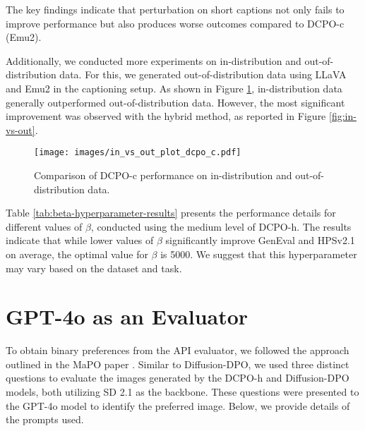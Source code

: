 


The key findings indicate that perturbation on short captions not only fails to improve performance but also produces worse outcomes compared to DCPO-c (Emu2).

Additionally, we conducted more experiments on in-distribution and out-of-distribution data. For this, we generated out-of-distribution data using LLaVA and Emu2 in the captioning setup. As shown in Figure \ref{fig:in-vs-out-dcpo-c}, in-distribution data generally outperformed out-of-distribution data. However, the most significant improvement was observed with the hybrid method, as reported in Figure \ref{fig:in-vs-out}.


\begin{figure}[h]
    \centering
    \texttt{[image: images/in\_vs\_out\_plot\_dcpo\_c.pdf]}
    \vspace{-2em}
    \caption{Comparison of DCPO-c performance on in-distribution and out-of-distribution data.}
    \label{fig:in-vs-out-dcpo-c}
\end{figure}


Table \ref{tab:beta-hyperparameter-results} presents the performance details for different values of \( \beta \), conducted using the medium level of DCPO-h. The results indicate that while lower values of \( \beta \) significantly improve GenEval and HPSv2.1 on average, the optimal value for \( \beta \) is 5000. We suggest that this hyperparameter may vary based on the dataset and task.



\section{GPT-4o as an Evaluator}
\label{gpt4o_evaluator}
To obtain binary preferences from the API evaluator, we followed the approach outlined in the MaPO paper \citep{hong2024marginawarepreferenceoptimizationaligning}. Similar to Diffusion-DPO, we used three distinct questions to evaluate the images generated by the DCPO-h and Diffusion-DPO models, both utilizing SD 2.1 as the backbone. These questions were presented to the GPT-4o model to identify the preferred image. Below, we provide details of the prompts used.

